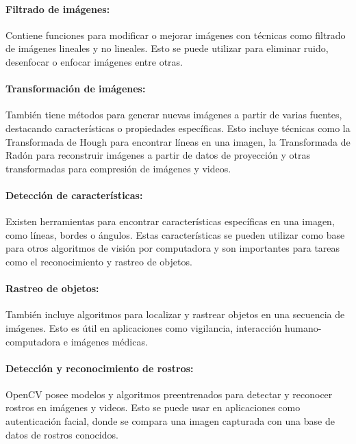 \paragraph*{Filtrado de imágenes:} Contiene funciones para modificar o mejorar imágenes con técnicas como filtrado de imágenes lineales y no lineales. Esto se puede utilizar para eliminar ruido, desenfocar o enfocar imágenes entre otras. \cite{inproceedings}

\paragraph*{Transformación de imágenes:} También tiene métodos para generar nuevas imágenes a partir de varias fuentes, destacando características o propiedades específicas. Esto incluye técnicas como la Transformada de Hough para encontrar líneas en una imagen, la Transformada de Radón para reconstruir imágenes a partir de datos de proyección y otras transformadas para compresión de imágenes y videos. \cite{inproceedings}

\paragraph*{Detección de características:} Existen herramientas para encontrar características específicas en una imagen, como líneas, bordes o ángulos. Estas características se pueden utilizar como base para otros algoritmos de visión por computadora y son importantes para tareas como el reconocimiento y rastreo de objetos.\cite{inproceedings}

\paragraph*{Rastreo de objetos:} También incluye algoritmos para localizar y rastrear objetos en una secuencia de imágenes. Esto es útil en aplicaciones como vigilancia, interacción humano-computadora e imágenes médicas.\cite{inproceedings}

\paragraph*{Detección y reconocimiento de rostros:} OpenCV posee modelos y algoritmos preentrenados para detectar y reconocer rostros en imágenes y videos. Esto se puede usar en aplicaciones como autenticación facial, donde se compara una imagen capturada con una base de datos de rostros conocidos.\cite{inproceedings}


